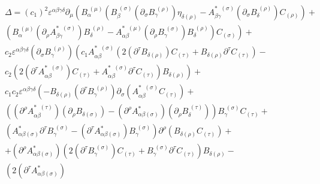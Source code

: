 \documentclass[a4paper,12pt]{article}
\begin{document}
\begin{eqnarray}
&&\Delta =\left( c_{1}\right) ^{2}\varepsilon ^{\alpha \beta \gamma \delta
}\partial _{\mu }\left( B_{\alpha }^{\;(\mu )}\left( B_{\beta }^{\;(\sigma
)}\left( \partial _{\sigma }B_{\gamma }^{\;(\rho )}\right) \eta _{\delta
(\rho )}-A_{\beta \gamma }^{*\;\;(\sigma )}\left( \partial _{\sigma
}B_{\delta }^{\;(\rho )}\right) C_{(\rho )}\right) +\right.  \nonumber \\
&&\left. \left( B_{\alpha }^{\;(\mu )}\left( \partial _{\rho }A_{\beta
\gamma }^{*\;\;(\sigma )}\right) B_{\delta }^{\;(\rho )}-A_{\alpha \beta
}^{*\;\;(\mu )}\left( \partial _{\rho }B_{\gamma }^{\;(\sigma )}\right)
B_{\delta }^{\;(\rho )}\right) C_{(\sigma )}\right) +  \nonumber \\
&&c_{2}\varepsilon ^{\alpha \beta \gamma \delta }\left( \partial _{\sigma
}B_{\gamma }^{\;(\rho )}\right) \left( c_{1}A_{\alpha \beta }^{*\;\;(\sigma
)}\left( 2\left( \partial ^{\tau }B_{\delta (\rho )}\right) C_{(\tau
)}+B_{\delta (\rho )}\partial ^{\tau }C_{(\tau )}\right) -\right.  \nonumber
\\
&&\left. c_{2}\left( 2\left( \partial ^{\tau }A_{\alpha \beta
}^{*\;\;(\sigma )}\right) C_{(\tau )}+A_{\alpha \beta }^{*\;\;(\sigma
)}\partial ^{\tau }C_{(\tau )}\right) B_{\delta (\rho )}\right) +  \nonumber
\\
&&c_{1}c_{2}\varepsilon ^{\alpha \beta \gamma \delta }\left( -B_{\delta
(\rho )}\left( \partial ^{\tau }B_{\gamma }^{\;(\rho )}\right) \partial
_{\sigma }\left( A_{\alpha \beta }^{*\;\;(\sigma )}C_{(\tau )}\right)
+\right.  \nonumber \\
&&\left( \left( \partial ^{\rho }A_{\alpha \beta }^{*\;\;(\tau )}\right)
\left( \partial _{\rho }B_{\delta (\sigma )}\right) -\left( \partial ^{\rho
}A_{\alpha \beta (\sigma )}^{*}\right) \left( \partial _{\rho }B_{\delta
}^{\;(\tau )}\right) \right) B_{\gamma }^{\;(\sigma )}C_{(\tau )}+  \nonumber
\\
&&\left( A_{\alpha \beta (\sigma )}^{*}\partial ^{\tau }B_{\gamma
}^{\;(\sigma )}-\left( \partial ^{\tau }A_{\alpha \beta (\sigma
)}^{*}\right) B_{\gamma }^{\;(\sigma )}\right) \partial ^{\rho }\left(
B_{\delta (\rho )}C_{(\tau )}\right) +  \nonumber \\
&&+\left( \partial ^{\rho }A_{\alpha \beta (\sigma )}^{*}\right) \left(
2\left( \partial ^{\tau }B_{\gamma }^{\;(\sigma )}\right) C_{(\tau
)}+B_{\gamma }^{\;(\sigma )}\partial ^{\tau }C_{(\tau )}\right) B_{\delta
(\rho )}-  \nonumber \\
&&\left( 2\left( \partial ^{\tau }A_{\alpha \beta (\sigma )}^{*}\right)

\end{eqnarray}
\end{document}
